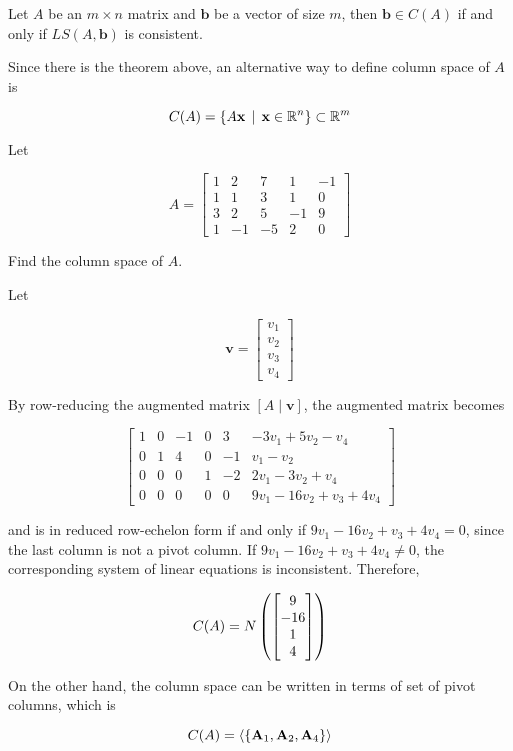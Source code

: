 \documentclass[a4paper,12pt]{article}
\begin{document}
\begin{thm}
  Let $A$ be an $m\times n$ matrix and $\mathbf{b}$ be a vector of size $m$, then $\mathbf{b}\in C(A)$ if and only if $LS(A,\mathbf{b})$ is consistent.
\end{thm}\n

Since there is the theorem above, an alternative way to define column space of $A$ is

$$C(A)=\left\{ A\mathbf{x}\,\mid\,\mathbf{x}\in\mathbb{R}^{n}\right\}\subset\mathbb{R}^{m}$$\s

\begin{exm}
  Let
  
  $$A=\begin{bmatrix}
    1 & 2 & 7 & 1 & -1\\
    1 & 1 & 3 & 1 & 0\\
    3 & 2 & 5 & -1 & 9\\
    1 & -1 & -5 & 2 & 0
  \end{bmatrix}$$\s

  Find the column space of $A$.\n

  \ans Let
  
  $$\mathbf{v}=\begin{bmatrix}
    v_{1}\\
    v_{2}\\
    v_{3}\\
    v_{4}
  \end{bmatrix}$$\s

  By row-reducing the augmented matrix $[A\!\mid\!\mathbf{v}]$, the augmented matrix becomes

  $$\begin{bmatrix}
    1 & 0 & -1 & 0 & 3 & -3v_{1}+5v_{2}-v_{4}\\
    0 & 1 & 4 & 0 & -1 & v_{1}-v_{2}\\
    0 & 0 & 0 & 1 & -2 & 2v_{1}-3v_{2}+v_{4}\\
    0 & 0 & 0 & 0 & 0 & 9v_{1}-16v_{2}+v_{3}+4v_{4}
  \end{bmatrix}$$\s

  and is in reduced row-echelon form if and only if $9v_{1}-16v_{2}+v_{3}+4v_{4}=0$, since the last column is not a pivot column. If $9v_{1}-16v_{2}+v_{3}+4v_{4}\neq 0$, the corresponding system of linear equations is inconsistent. Therefore,
  
  $$C(A)=N\left( \begin{bmatrix}
    9\\
    -16\\
    1\\
    4
  \end{bmatrix}\right)$$\s

  On the other hand, the column space can be written in terms of set of pivot columns, which is

  $$C(A)=\left\langle \left\{ \mathbf{A}_{1},\mathbf{A}_{2},\mathbf{A}_{4}\right\}\right\rangle$$
\end{exm}\n
\end{document}
